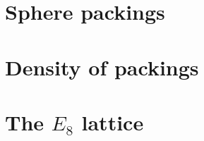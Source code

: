\pagebreak
%
%
%
%
%
%
%
\section{Sphere packings}\label{sec:sphere-packings}





\pagebreak
\section{Density of packings}\label{sec:packings-density}



\pagebreak
\section{The $E_8$ lattice}


